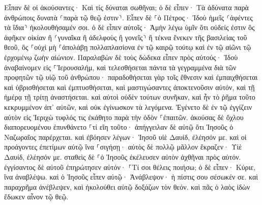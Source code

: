\documentclass[twoside, 9pt]{extreport}
\begin{document}
Εἶπαν δὲ οἱ ἀκούσαντες· Καὶ τίς δύναται σωθῆναι; 
ὁ δὲ εἶπεν· Τὰ ἀδύνατα παρὰ ἀνθρώποις δυνατὰ ⸂παρὰ τῷ θεῷ ἐστιν⸃. 
Εἶπεν δὲ ⸀ὁ Πέτρος· Ἰδοὺ ἡμεῖς ⸂ἀφέντες τὰ ἴδια⸃ ἠκολουθήσαμέν σοι. 
ὁ δὲ εἶπεν αὐτοῖς· Ἀμὴν λέγω ὑμῖν ὅτι οὐδείς ἐστιν ὃς ἀφῆκεν οἰκίαν ἢ ⸂γυναῖκα ἢ ἀδελφοὺς ἢ γονεῖς⸃ ἢ τέκνα ἕνεκεν τῆς βασιλείας τοῦ θεοῦ, 
ὃς ⸀οὐχὶ μὴ ⸀ἀπολάβῃ πολλαπλασίονα ἐν τῷ καιρῷ τούτῳ καὶ ἐν τῷ αἰῶνι τῷ ἐρχομένῳ ζωὴν αἰώνιον. 
Παραλαβὼν δὲ τοὺς δώδεκα εἶπεν πρὸς αὐτούς· Ἰδοὺ ἀναβαίνομεν εἰς ⸀Ἰερουσαλήμ, καὶ τελεσθήσεται πάντα τὰ γεγραμμένα διὰ τῶν προφητῶν τῷ υἱῷ τοῦ ἀνθρώπου· 
παραδοθήσεται γὰρ τοῖς ἔθνεσιν καὶ ἐμπαιχθήσεται καὶ ὑβρισθήσεται καὶ ἐμπτυσθήσεται, 
καὶ μαστιγώσαντες ἀποκτενοῦσιν αὐτόν, καὶ τῇ ἡμέρᾳ τῇ τρίτῃ ἀναστήσεται. 
καὶ αὐτοὶ οὐδὲν τούτων συνῆκαν, καὶ ἦν τὸ ῥῆμα τοῦτο κεκρυμμένον ἀπ᾽ αὐτῶν, καὶ οὐκ ἐγίνωσκον τὰ λεγόμενα. 
Ἐγένετο δὲ ἐν τῷ ἐγγίζειν αὐτὸν εἰς Ἰεριχὼ τυφλός τις ἐκάθητο παρὰ τὴν ὁδὸν ⸀ἐπαιτῶν. 
ἀκούσας δὲ ὄχλου διαπορευομένου ἐπυνθάνετο ⸀τί εἴη τοῦτο· 
ἀπήγγειλαν δὲ αὐτῷ ὅτι Ἰησοῦς ὁ Ναζωραῖος παρέρχεται. 
καὶ ἐβόησεν λέγων· Ἰησοῦ υἱὲ Δαυίδ, ἐλέησόν με. 
καὶ οἱ προάγοντες ἐπετίμων αὐτῷ ἵνα ⸀σιγήσῃ· αὐτὸς δὲ πολλῷ μᾶλλον ἔκραζεν· Υἱὲ Δαυίδ, ἐλέησόν με. 
σταθεὶς δὲ ⸀ὁ Ἰησοῦς ἐκέλευσεν αὐτὸν ἀχθῆναι πρὸς αὐτόν. ἐγγίσαντος δὲ αὐτοῦ ἐπηρώτησεν αὐτόν· 
⸀Τί σοι θέλεις ποιήσω; ὁ δὲ εἶπεν· Κύριε, ἵνα ἀναβλέψω. 
καὶ ὁ Ἰησοῦς εἶπεν αὐτῷ· Ἀνάβλεψον· ἡ πίστις σου σέσωκέν σε. 
καὶ παραχρῆμα ἀνέβλεψεν, καὶ ἠκολούθει αὐτῷ δοξάζων τὸν θεόν. καὶ πᾶς ὁ λαὸς ἰδὼν ἔδωκεν αἶνον τῷ θεῷ. 
\end{document}

